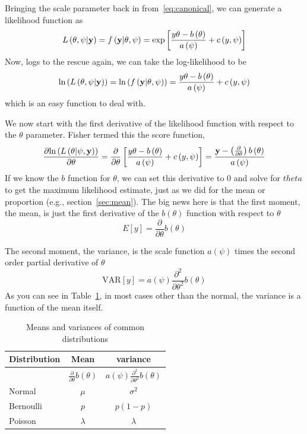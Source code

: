 Bringing the scale parameter back in from~\ref{eq:canonical}, we can generate a likelihood function as
\[
L\left(\theta,\psi|{\bf y}\right)=f\left({\bf y}|\theta,\psi\right)=\mbox{exp}\left[\frac{y\theta-b\left(\theta\right)}{a\left(\psi\right)}+c\left(y,\psi\right)\right]
\]
Now, logs to the rescue again, we can take the log-likelihood to be
\begin{equation}
\mbox{ln}\left(L\left(\theta,\psi|{\bf y}\right)\right)=\mbox{ln}\left(f\left({\bf y}|\theta,\psi\right)\right)=\frac{y\theta-b\left(\theta\right)}{a\left(\psi\right)}+c\left(y,\psi\right)
\end{equation}
which is an easy function to deal with.

We now start with the first derivative of the likelihood function with respect to the $\theta$ parameter. Fisher termed this the score function,
\begin{equation}
\frac{\partial\mbox{ln}\left(L\left(\theta|\psi,{\bf y}\right)\right)}{\partial\theta}=\frac{\partial}{\partial\theta}\left[\frac{y\theta-b\left(\theta\right)}{a\left(\psi\right)}+c\left(y,\psi\right)
\right]=\frac{{\bf y}-\left(\frac{\partial}{\partial\theta}\right)b\left(\theta\right)}{a\left(\psi\right)}
\end{equation}
If we know the $b$ function for $\theta$, we can set this derivative to 0 and solve for $theta$ to get the maximum likelihood estimate, just as we did for the mean or proportion (e.g., section~\ref{sec:mean}). The big news here is that the first moment, the mean, is just the first derivative of the $b\left(\theta\right)$ function with respect to $\theta$
\begin{equation}
E[y] = \frac{\partial}{\partial \theta}b(\theta)
\end{equation}

The second moment, the variance, is the scale function $a\left(\psi\right)$ times the
second order partial derivative of $\theta$
\begin{equation}
\mbox{VAR}[y] = a\left(\psi\right)\frac{\partial^2}{\partial \theta^2}b(\theta)
\end{equation}
As you can see in Table~\ref{tab:glmmeansandvar}, in most cases other than the normal, the variance is a function of the mean itself.

\begin{table}[htbp]\centering
\caption{Means and variances of common distributions\label{tab:glmmeansandvar}
\textbf{} }\begin{tabular} {@{} l cc @{}} \\
Distribution & Mean & variance \\ \hline
& $\frac{\partial}{\partial \theta}b(\theta)$ & $a\left(\psi\right)\frac{\partial^2}{\partial \theta^2}b(\theta)$ \\ \hline
Normal & $\mu$ & $\sigma^2$ \\
Bernoulli & $p$ & $p(1-p)$ \\
Poisson & $\lambda$ & $\lambda$ \\ \hline
\end{tabular}
\end{table}

